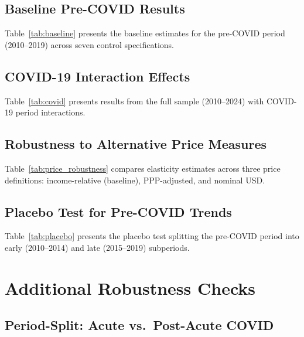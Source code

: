 \documentclass[preprint,review,12pt,authoryear]{styles/elsarticle}
\begin{document}
\subsection{Baseline Pre-COVID Results}
\vspace{-2pt}
\small
\singlespacing

{Table~\ref{tab:baseline} presents the baseline estimates for the pre-COVID period
(2010--2019) across seven control specifications.}
\vspace{-2pt}


\clearpage

\subsection{COVID-19 Interaction Effects}
\small
\singlespacing

Table~\ref{tab:covid} presents results from the full sample (2010--2024) with
COVID-19 period interactions.


\clearpage

\subsection{Robustness to Alternative Price Measures}
\singlespacing

Table~\ref{tab:price_robustness} compares elasticity estimates across three price
definitions: income-relative (baseline), PPP-adjusted, and nominal USD.


\clearpage

\subsection{Placebo Test for Pre-COVID Trends}
\small
\singlespacing

Table~\ref{tab:placebo} presents the placebo test splitting the pre-COVID period
into early (2010--2014) and late (2015--2019) subperiods.


\clearpage

\section{Additional Robustness Checks}
\label{app:robustness}
\setcounter{table}{0}
\small
\singlespacing

\subsection{Period-Split: Acute vs.\ Post-Acute COVID}
\end{document}
